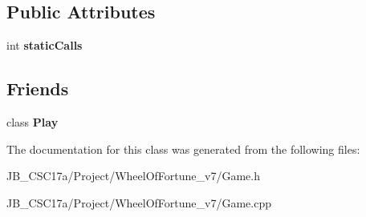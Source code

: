 \subsection*{Public Attributes}
\begin{DoxyCompactItemize}
\item 
\hypertarget{class_game_ac3bca0716ae3681b13214b1fcd57784b}{}\label{class_game_ac3bca0716ae3681b13214b1fcd57784b} 
int {\bfseries static\+Calls}
\end{DoxyCompactItemize}
\subsection*{Friends}
\begin{DoxyCompactItemize}
\item 
\hypertarget{class_game_a7c2f46121e704a36ac14bdfdaced4e04}{}\label{class_game_a7c2f46121e704a36ac14bdfdaced4e04} 
class {\bfseries Play}
\end{DoxyCompactItemize}


The documentation for this class was generated from the following files\+:\begin{DoxyCompactItemize}
\item 
J\+B\+\_\+\+C\+S\+C17a/\+Project/\+Wheel\+Of\+Fortune\+\_\+v7/Game.\+h\item 
J\+B\+\_\+\+C\+S\+C17a/\+Project/\+Wheel\+Of\+Fortune\+\_\+v7/Game.\+cpp\end{DoxyCompactItemize}

